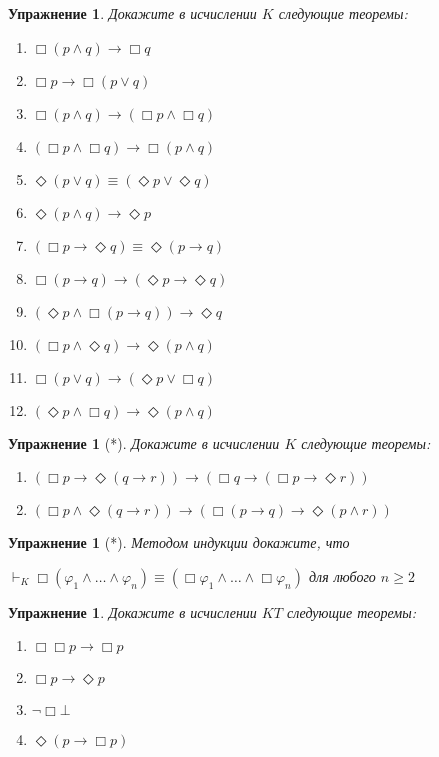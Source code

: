 \documentclass[11pt]{article}
\newtheorem{exercise}[theorem]{Упражнение}
\begin{document}
\begin{exercise}
Докажите в исчислении $K$ следующие теоремы:
\begin{multicols}{2}
\begin{enumerate}
  \item $\Box (p \wedge q) \to \Box q$
  \item $\Box p \to \Box (p \vee q)$
  \item $\Box (p \wedge q) \to (\Box p \wedge \Box q)$
  \item $(\Box p \wedge \Box q) \to \Box (p \wedge q)$
  \item $\Diamond (p \lor q) \equiv (\Diamond p \vee \Diamond q)$
  \item $\Diamond (p \wedge q) \to \Diamond p$
  \item $(\Box p \to \Diamond q) \equiv \Diamond (p \to q)$
  \item $\Box (p \to q) \to (\Diamond p \to \Diamond q)$
  \item $(\Diamond p \wedge \Box (p \to q)) \to \Diamond q$
  \item $(\Box p \wedge \Diamond q) \to \Diamond (p \wedge q) $
  \item $\Box (p \vee q) \to (\Diamond p \vee \Box q)$ 
  \item $(\Diamond p \wedge \Box q) \to \Diamond(p \wedge q) $
\end{enumerate}	
\end{multicols}
\end{exercise}

\begin{exercise}[*]
Докажите в исчислении $K$ следующие теоремы:
\begin{enumerate}
 \item $ (\Box p \to \Diamond (q \to r)) \to (\Box q \to (\Box p \to \Diamond r))$
 \item $(\Box p \wedge \Diamond (q \to r)) \to (\Box (p \to q ) \to  \Diamond (p \wedge r))$
\end{enumerate}	
\end{exercise}


\begin{exercise}[*]
Методом индукции докажите, что 
\begin{center}
$\vdash_{K} \Box (\varphi_1 \wedge \dots \wedge \varphi_n) \equiv (\Box \varphi_1 \wedge \dots \wedge \Box \varphi_n)$ для любого $n \geq 2$
\end{center}
\end{exercise}


\begin{exercise}
Докажите в исчислении $KT$ следующие теоремы:
\begin{multicols}{2}
	\begin{enumerate}
		\item $\Box \Box p \to \Box p$
		\item $\Box p \to \Diamond p$
		\item $\neg \Box \bot$
		\item $\Diamond (p \to \Box p)$
	\end{enumerate}
\end{multicols}
\end{exercise}
\end{document}
